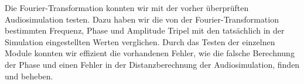 Die Fourier-Transformation konnten wir mit der vorher überprüften Audiosimulation testen. Dazu haben wir die von der Fourier-Transformation bestimmten Frequenz, Phase und Amplitude Tripel mit den tatsächlich in der Simulation eingestellten Werten verglichen.
Durch das Testen der einzelnen Module konnten wir effizient die vorhandenen Fehler, wie die falsche Berechnung der Phase und einen Fehler in der Distanzberechnung der Audiosimulation, finden und beheben.
